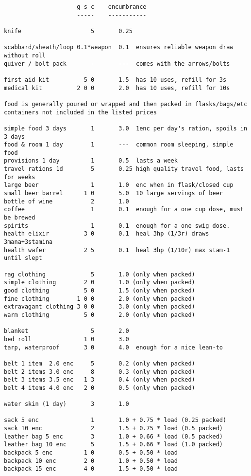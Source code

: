 \small
\begin{verbatim}
                     g s c    encumbrance
                     -----    -----------

knife                    5       0.25

scabbard/sheath/loop 0.1*weapon  0.1  ensures reliable weapon draw without roll
quiver / bolt pack       -       ---  comes with the arrows/bolts

first aid kit          5 0       1.5  has 10 uses, refill for 3s
medical kit          2 0 0       2.0  has 10 uses, refill for 10s

food is generally poured or wrapped and then packed in flasks/bags/etc
containers not included in the listed prices

simple food 3 days       1       3.0  1enc per day's ration, spoils in 3 days
food & room 1 day        1       ---  common room sleeping, simple food
provisions 1 day         1       0.5  lasts a week
travel rations 1d        5       0.25 high quality travel food, lasts for weeks
large beer               1       1.0  enc when in flask/closed cup
small beer barrel      1 0       5.0  10 large servings of beer
bottle of wine           2       1.0
coffee                   1       0.1  enough for a one cup dose, must be brewed
spirits                  1       0.1  enough for a one swig dose.
health elixir          3 0       0.1  heal 3hp (1/3r) draws 3mana+3stamina
health wafer           2 5       0.1  heal 3hp (1/10r) max stam-1 until slept

rag clothing             5       1.0 (only when packed)
simple clothing        2 0       1.0 (only when packed)
good clothing          5 0       1.5 (only when packed)
fine clothing        1 0 0       2.0 (only when packed)
extravagant clothing 3 0 0       3.0 (only when packed)
warm clothing          5 0       2.0 (only when packed)

blanket                  5       2.0
bed roll               1 0       3.0
tarp, waterproof       3 0       4.0  enough for a nice lean-to

belt 1 item  2.0 enc     5       0.2 (only when packed)
belt 2 items 3.0 enc     8       0.3 (only when packed)
belt 3 items 3.5 enc   1 3       0.4 (only when packed)
belt 4 items 4.0 enc   2 0       0.5 (only when packed)

water skin (1 day)       3       1.0

sack 5 enc               1       1.0 + 0.75 * load (0.25 packed)
sack 10 enc              2       1.5 + 0.75 * load (0.5 packed)
leather bag 5 enc        3       1.0 + 0.66 * load (0.5 packed)
leather bag 10 enc       5       1.5 + 0.66 * load (1.0 packed)
backpack 5 enc         1 0       0.5 + 0.50 * load
backpack 10 enc        2 0       1.0 + 0.50 * load
backpack 15 enc        4 0       1.5 + 0.50 * load


\end{verbatim}
